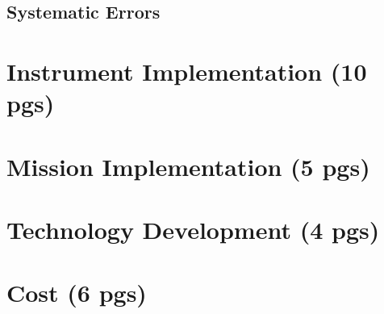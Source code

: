 \documentclass[12pt]{article}
\begin{document}
\subsection{Systematic Errors}


\section{Instrument Implementation (10 pgs)}


\section{Mission Implementation (5 pgs)}


\section{Technology Development (4 pgs)}


\section{Cost (6 pgs)}


\newpage




\end{document}
